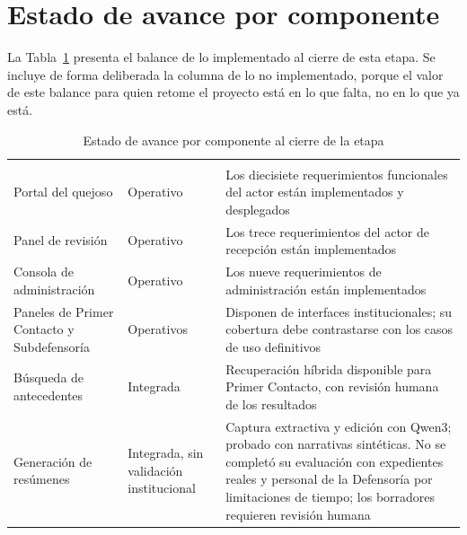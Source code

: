 \section{Estado de avance por componente}
\label{sec:estado_avance}
La Tabla~\ref{tab:estado_avance} presenta el balance de lo implementado al cierre de esta etapa.
Se incluye de forma deliberada la columna de lo no implementado, porque el valor de este balance
para quien retome el proyecto está en lo que falta, no en lo que ya está.


\small
\renewcommand{\arraystretch}{1.25}
\setlength{\tabcolsep}{4pt}

\begin{longtable}{|p{3.7cm}|p{2.1cm}|p{8.2cm}|}
	\caption{Estado de avance por componente al cierre de la etapa}
	\label{tab:estado_avance} \\
	\hline
	\rowcolor{headerblue}
	\headercell{Componente} & \headercell{Estado} & \headercell{Observaciones} \\
	\hline
	\endfirsthead

	\hline
	\rowcolor{headerblue}
	\headercell{Componente} & \headercell{Estado} & \headercell{Observaciones} \\
	\hline
	\endhead

	Portal del quejoso & Operativo & Los diecisiete requerimientos funcionales del actor están
	implementados y desplegados \\ \hline

	Panel de revisión & Operativo & Los trece requerimientos del actor de recepción están
	implementados \\ \hline

	Consola de administración & Operativo & Los nueve requerimientos de administración están
	implementados \\ \hline

	Paneles de Primer Contacto y Subdefensoría & Operativos & Disponen de interfaces institucionales; su cobertura debe contrastarse con los casos de uso definitivos \\ \hline

	Búsqueda de antecedentes & Integrada & Recuperación híbrida disponible para Primer Contacto, con revisión humana de los resultados \\ \hline

	Generación de resúmenes & Integrada, sin validación institucional & Captura extractiva y edición con Qwen3; probado con narrativas sintéticas. No se completó su evaluación con expedientes reales y personal de la Defensoría por limitaciones de tiempo; los borradores requieren revisión humana \\ \hline


\end{longtable}
